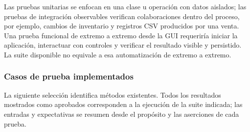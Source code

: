 Las pruebas unitarias se enfocan en una clase u operación con datos aislados; las pruebas de integración observables verifican colaboraciones dentro del proceso, por ejemplo, cambios de inventario y registros CSV producidos por una venta. Una prueba funcional de extremo a extremo desde la GUI requeriría iniciar la aplicación, interactuar con controles y verificar el resultado visible y persistido. La suite disponible no equivale a esa automatización de extremo a extremo.

\subsubsection{Casos de prueba implementados}

La siguiente selección identifica métodos existentes. Todos los resultados mostrados como aprobados corresponden a la ejecución de la suite indicada; las entradas y expectativas se resumen desde el propósito y las aserciones de cada prueba.

